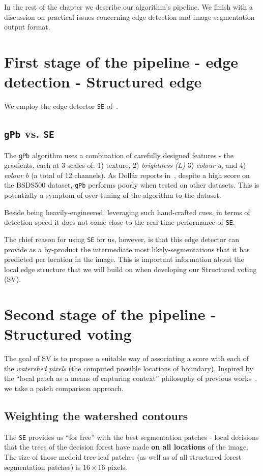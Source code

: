 In the rest of the chapter we describe our algorithm's pipeline. We finish with a discussion on practical issues concerning edge detection and image segmentation output format.

\section[First stage of the pipeline - Structured edge]{First stage of the pipeline - edge detection - Structured edge}
We employ the edge detector {\tt SE} of~\cite{DollarICCV13edges,Dollar2015PAMI}.

\subsection{{\tt gPb} vs. {\tt SE}}
The {\tt gPb} algorithm uses a combination of carefully designed features - the gradients, each at 3 scales of: 1) texture, 2) {\it brightness (L)} 3) {\it colour a}, and 4) {\it colour b} (a total of 12 channels). As Doll\'ar reports in~\cite{DollarICCV13edges}, despite a high score on the BSDS500 dataset, {\tt gPb} performs poorly when tested on other datasets. This is potentially a symptom of over-tuning of the algorithm to the dataset.

Beside being heavily-engineered, leveraging such hand-crafted cues, in terms of detection speed it does not come close to the real-time performance of {\tt SE}.

The chief reason for using {\tt SE} for us, however, is that this edge detector can provide as a by-product the intermediate most likely-segmentations that it has predicted per location in the image. This is important information about the local edge structure that we will build on when developing our Structured voting (SV).

\section{Second stage of the pipeline - Structured voting}
\label{sec:ch4-SE-SV-UCM_SV_details}
The goal of SV is to propose a suitable way of associating a score with each of the {\it watershed pixels} (the computed possible locations of boundary). Inspired by the ``local patch as a means of capturing context'' philosophy of previous works~\cite{Dollar2006supervised,LimZD13,DollarICCV13edges}, we take a patch comparison approach.

\subsection{Weighting the watershed contours} %
The {\tt SE} provides us ``for free'' with the best segmentation patches - local decisions that the trees of the decision forest have made {\bf on all locations} of the image. The size of those medoid tree leaf patches (as well as of all structured forest segmentation patches) is $16\times 16$ pixels.

